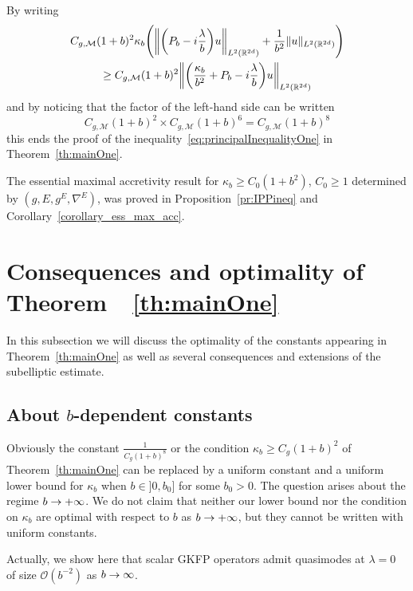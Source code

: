 \documentclass[10pt]{amsart}
\theoremstyle{definition}\newtheorem{defi}[theo]{Definition}\newtheorem{rema}[theo]{Remark}\newtheorem{exam}[theo]{Example}\newtheorem{exem}[theo]{Example}\newtheorem{nota}[theo]{Notation}
\newcommand{\R}{\mathbb{R}}
\newcommand{\clO}{\mathcal{O}}
\newcommand{\clM}{\mathcal{M}}
\let\originalleft\left
\let\originalright\right
\renewcommand{\left}{\mathopen{}\mathclose\bgroup\originalleft}
\renewcommand{\right}{\aftergroup\egroup\originalright}
\renewcommand*{\to}{\mathchoice{\longrightarrow}{\rightarrow}{\rightarrow}{\rightarrow}}
\begin{document}
By writing
\begin{multline*}
C_{g,\clM}(1+b)^2 \kappa_b \left(\left\|\left(P_b-i\frac{\lambda}{b}\right)u\right\|_{L^2(\R^{2d})} + \frac{1}{b^2}\|u\|_{L^2(\R^{2d})}
\right)\\
\geq C_{g,\clM}(1+b)^2 \left\|\left(\frac{\kappa_b}{b^2}+P_b-i\frac{\lambda}{b}\right)u\right\|_{L^2(\R^{2d})}
\end{multline*}
and by noticing that the factor of the left-hand side can be written
\[
C_{g,\clM}(1+b)^2 \times C_{g,\clM}(1+b)^6=C_{g,\clM}(1+b)^8
\]
this ends the proof of the inequality~\eqref{eq:principalInequalityOne} in Theorem~\ref{th:mainOne}.

The essential maximal accretivity result for $\kappa_{b}\geq C_{0}(1+b^{2})$, $C_{0}\geq 1$ determined by $(g,E,g^{E},\nabla^{E})$, was proved in Proposition~\ref{pr:IPPineq} and Corollary~\ref{corollary_ess_max_acc}.

\section{Consequences and optimality of Theorem~~\ref{th:mainOne}}\label{sec:conseqOpt}

In this subsection we will discuss the optimality of the constants appearing in Theorem~\ref{th:mainOne} as well as several consequences and extensions of the subelliptic estimate.

\subsection{About \texorpdfstring{$b$}{b}-dependent constants}\label{sec:bdep}
Obviously the constant $\frac{1}{C_{g}(1+b)^{8}}$ or the condition $\kappa_{b}\geq C_{g}(1+b)^{2}$ of Theorem~\ref{th:mainOne} can be replaced by a uniform constant and a uniform lower bound for $\kappa_{b}$ when $b\in]0,b_{0}]$ for some $b_{0}>0$. The question arises about the regime $b\to +\infty$. We do not claim that neither our lower bound nor the condition on $\kappa_{b}$ are optimal with respect to $b$ as $b\to +\infty$, but they cannot be written with uniform constants.

Actually, we show here that scalar GKFP operators admit quasimodes at $\lambda = 0$ of size $\clO(b^{-2})$ as $b \to \infty$.
\end{document}
